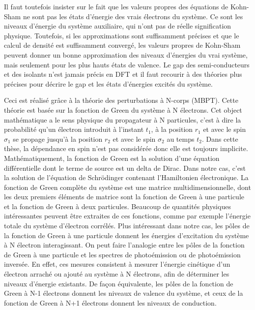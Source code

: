 Il faut toutefois insister sur le fait que les valeurs propres des équations de Kohn-Sham ne sont pas les états d'énergie des vrais électrons du système. Ce sont les niveaux d'énergie du système auxiliaire, qui n'ont pas de réelle signification physique. Toutefois, si les approximations sont suffisamment précises et que le calcul de densité est suffisamment convergé, les valeurs propres de Kohn-Sham peuvent donner un bonne approximation des niveaux d'énergies du vrai système, mais seulement pour les plus hauts états de valence. Le gap des semi-conducteurs et des isolants n'est jamais précis en DFT et il faut recourir à des théories plus précises pour décrire le gap et les états d'énergies excités du système.

Ceci est réalisé grâce à la théorie des perturbations à N-corps (MBPT). Cette théorie est basée sur la fonction de Green du système à N électrons. Cet object mathématique a le sens physique du propagateur à N particules, c'est à dire la probabilité qu'un électron introduit à l'instant $t_1$, à la position $r_1$ et avec le spin $\sigma_1$ se propage jusqu'à la position $r_2$ et avec le spin $\sigma_2$ au temps $t_2$. Dans cette thèse, la dépendance en spin n'est pas considérée donc elle est toujours implicite. Mathématiquement, la fonction de Green est la solution d'une équation différentielle dont le terme de source est un delta de Dirac. Dans notre cas, c'est la solution de l'équation de Schrödinger contenant l'Hamiltonien électronique. La fonction de Green complète du système est une matrice multidimensionnelle, dont les deux premiers éléments de matrice sont la fonction de Green à une particule et la fonction de Green à deux particules. Beaucoup de quantités physiques intéressantes peuvent être extraites de ces fonctions, comme par exemple l'énergie totale du système d'électron corrélés. Plus intéressant dans notre cas, les pôles de la fonction de Green à une particule donnent les énergies d'excitation du système à N électron interagissant. On peut faire l'analogie entre les pôles de la fonction de Green à une particule et les spectres de photoémission ou de photoémission inversée. En effet, ces mesures consistent à mesurer l'énergie cinétique d'un électron arraché ou ajouté au système à N électrons, afin de déterminer les niveaux d'énergie existants. De façon équivalente, les pôles de la fonction de Green à N-1 électrons donnent les niveaux de valence du système, et ceux de la fonction de Green à N+1 électrons donnent les niveaux de conduction.

